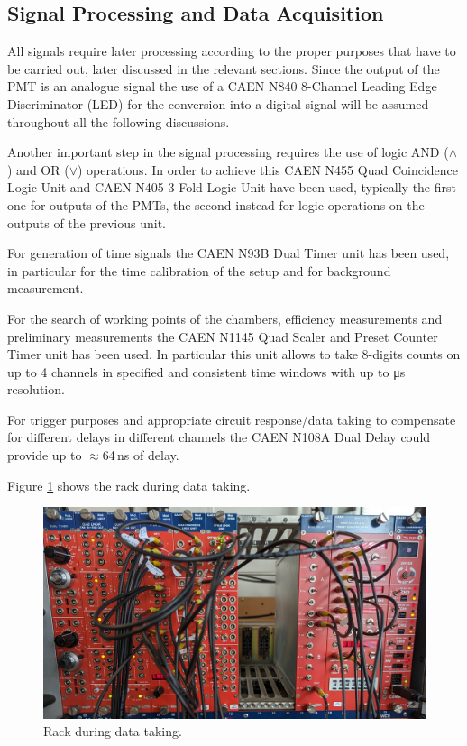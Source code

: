 \documentclass[../main.tex]{subfiles}
\begin{document}
\subsection{Signal Processing and Data Acquisition}
All signals require later processing according to the proper purposes that have to be carried out, later discussed in the relevant sections. Since the output of the PMT is an analogue signal the use of a CAEN N840 8-Channel Leading Edge Discriminator (LED) for the conversion into a digital signal will be assumed throughout all the following discussions.

Another important step in the signal processing requires the use of logic AND ($\land$) and OR ($\lor$) operations. In order to achieve this CAEN N455 Quad Coincidence Logic Unit and CAEN N405 3 Fold Logic Unit have been used, typically the first one for outputs of the PMTs, the second instead for logic operations on the outputs of the previous unit.

For generation of time signals the CAEN N93B Dual Timer unit has been used, in particular for the time calibration of the setup and for background measurement.

For the search of working points of the chambers, efficiency measurements and preliminary measurements the CAEN N1145 Quad Scaler and Preset Counter Timer unit has been used. In particular this unit allows to take 8-digits counts on up to 4 channels in specified and consistent time windows with up to \unit{\micro \second} resolution.

For trigger purposes and appropriate circuit response/data taking to compensate for different delays in different channels the CAEN N108A Dual Delay could provide up to \mbox{$\approx$64\,ns} of delay.

Figure \ref{fig:rack} shows the rack during data taking.\\

\begin{figure}[htb]
    \centering
    \includegraphics[width=0.7 \linewidth]{images/rack.jpg}
    \caption{Rack during data taking.}
    \label{fig:rack}
\end{figure}
\end{document}
